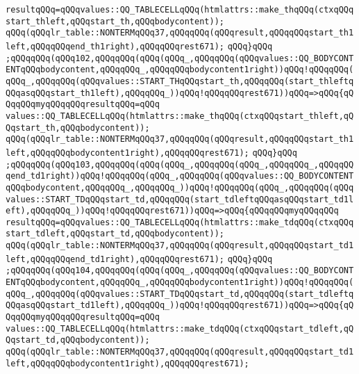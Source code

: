 \verb|resultqQQq=qQQqvalues::QQ_TABLECELLqQQq(htmlattrs::make_thqQQq(ctxqQQqstart_thleft,qQQqstart_th,qQQqbodycontent));|\newline
\verb|qQQq(qQQqlr_table::NONTERMqQQq37,qQQqqQQq(qQQqresult,qQQqqQQqstart_th1left,qQQqqQQqend_th1right),qQQqqQQqrest671);|\newline
\verb|qQQq}qQQq|\newline
\verb|;qQQqqQQq(qQQq102,qQQqqQQq(qQQq(qQQq_,qQQqqQQq(qQQqvalues::QQ_BODYCONTENTqQQqbodycontent,qQQqqQQq_,qQQqqQQqbodycontent1right))qQQq!qQQqqQQq(qQQq_,qQQqqQQq(qQQqvalues::START_THqQQqstart_th,qQQqqQQq(start_thleftqQQqasqQQqstart_th1left),qQQqqQQq_))qQQq!qQQqqQQqrest671))qQQq=>qQQq{qQQqqQQqmyqQQqqQQqresultqQQq=qQQq|\newline
\verb|values::QQ_TABLECELLqQQq(htmlattrs::make_thqQQq(ctxqQQqstart_thleft,qQQqstart_th,qQQqbodycontent));|\newline
\verb|qQQq(qQQqlr_table::NONTERMqQQq37,qQQqqQQq(qQQqresult,qQQqqQQqstart_th1left,qQQqqQQqbodycontent1right),qQQqqQQqrest671);|\newline
\verb|qQQq}qQQq|\newline
\verb|;qQQqqQQq(qQQq103,qQQqqQQq(qQQq(qQQq_,qQQqqQQq(qQQq_,qQQqqQQq_,qQQqqQQqend_td1right))qQQq!qQQqqQQq(qQQq_,qQQqqQQq(qQQqvalues::QQ_BODYCONTENTqQQqbodycontent,qQQqqQQq_,qQQqqQQq_))qQQq!qQQqqQQq(qQQq_,qQQqqQQq(qQQqvalues::START_TDqQQqstart_td,qQQqqQQq(start_tdleftqQQqasqQQqstart_td1left),qQQqqQQq_))qQQq!qQQqqQQqrest671))qQQq=>qQQq{qQQqqQQqmyqQQqqQQq|\newline
\verb|resultqQQq=qQQqvalues::QQ_TABLECELLqQQq(htmlattrs::make_tdqQQq(ctxqQQqstart_tdleft,qQQqstart_td,qQQqbodycontent));|\newline
\verb|qQQq(qQQqlr_table::NONTERMqQQq37,qQQqqQQq(qQQqresult,qQQqqQQqstart_td1left,qQQqqQQqend_td1right),qQQqqQQqrest671);|\newline
\verb|qQQq}qQQq|\newline
\verb|;qQQqqQQq(qQQq104,qQQqqQQq(qQQq(qQQq_,qQQqqQQq(qQQqvalues::QQ_BODYCONTENTqQQqbodycontent,qQQqqQQq_,qQQqqQQqbodycontent1right))qQQq!qQQqqQQq(qQQq_,qQQqqQQq(qQQqvalues::START_TDqQQqstart_td,qQQqqQQq(start_tdleftqQQqasqQQqstart_td1left),qQQqqQQq_))qQQq!qQQqqQQqrest671))qQQq=>qQQq{qQQqqQQqmyqQQqqQQqresultqQQq=qQQq|\newline
\verb|values::QQ_TABLECELLqQQq(htmlattrs::make_tdqQQq(ctxqQQqstart_tdleft,qQQqstart_td,qQQqbodycontent));|\newline
\verb|qQQq(qQQqlr_table::NONTERMqQQq37,qQQqqQQq(qQQqresult,qQQqqQQqstart_td1left,qQQqqQQqbodycontent1right),qQQqqQQqrest671);|\newline
